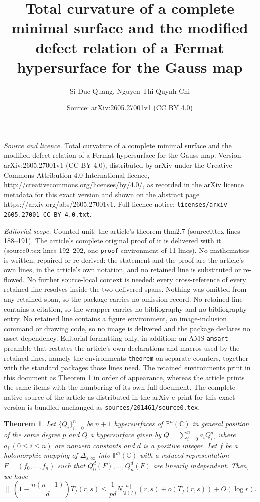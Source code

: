 \documentclass[10pt,a4paper]{amsart}
\title{Total curvature of a complete minimal surface and the modified defect relation of a Fermat hypersurface for the Gauss map}
\author{Si Duc Quang, Nguyen Thi Quynh Chi}
\date{Source: arXiv:2605.27001v1 (CC BY 4.0)}
\newtheorem{theorem}{Theorem}
\newcommand{\C}{{\mathbb{C}}}
\renewcommand{\P}{{\mathbb{P}}}
\begin{document}
\maketitle

\noindent\emph{Source and licence.} Total curvature of a complete minimal surface and the modified defect relation of a Fermat hypersurface for the Gauss map. Version arXiv:2605.27001v1 (CC BY 4.0), distributed by arXiv under the Creative Commons Attribution 4.0 International licence, http://creativecommons.org/licenses/by/4.0/, as recorded in the arXiv licence metadata for this exact version and shown on the abstract page https://arxiv.org/abs/2605.27001v1. Full licence notice: \texttt{licenses/arxiv-2605.27001-CC-BY-4.0.txt}.\par\smallskip

\noindent\textit{Editorial scope.} Counted unit: the article's theorem thm2.7 (source0.tex lines 188--191). The article's complete original proof of it is delivered with it (source0.tex lines 192--202, one \texttt{proof} environment of 11 lines). No mathematics is written, repaired or re-derived: the statement and the proof are the article's own lines, in the article's own notation, and no retained line is substituted or re-flowed.  No further source-local context is needed: every cross-reference of every retained line resolves inside the two delivered spans.  Nothing was omitted from any retained span, so the package carries no omission record.  No retained line contains a citation, so the wrapper carries no bibliography and no bibliography entry.  No retained line contains a figure environment, an image-inclusion command or drawing code, so no image is delivered and the package declares no asset dependency.  Editorial formatting only, in addition: an AMS \texttt{amsart} preamble that restates the article's own declarations and macros used by the retained lines, namely the environments \texttt{theorem} on separate counters, together with the standard packages those lines need.  The retained environments print in this document as Theorem 1 in order of appearance, whereas the article prints the same items with the numbering of its own full document.  The complete native source of the article as distributed in the arXiv e-print for this exact version is bundled unchanged as \texttt{sources/201461/source0.tex}.
\begin{theorem}\label{thm2.7} 
Let $\{Q_i\}_{i=0}^n$ be $n+1$ hypersurfaces of $\P^n(\C)$ in general position of the same degree $p$ and $Q$ a hypersurface given by $Q=\sum_{i=0}^na_iQ_i^d$, where $a_i\ (0\le i\le n)$ are nonzero constants and $d$ is a positive integer. Let $f$ be a holomorphic mapping of $\Delta_{s,\infty}$ into $\P^n(\C)$ with a reduced representation $F=(f_0,\ldots,f_n)$ such that $Q_0^d(F),\ldots,Q_n^d(F)$ are linearly independent. Then, we have
$$ \biggl \|\ \left(1-\frac{n(n+1)}{d}\right)T_f(r,s)\le \frac{1}{pd}N^{[n]}_{Q(f)}(r,s)+o(T_f(r,s))+O(\log r).$$
\end{theorem}
\end{document}
